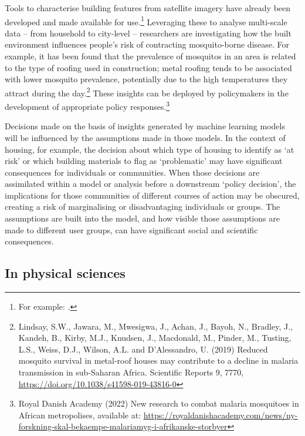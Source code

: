 Tools to characterise building features from satellite imagery have
already been developed and made available for use.\footnote{For example: \cite{Quinn-mapping21}.} Leveraging these to analyse multi-scale data -- from household to
city-level -- researchers are investigating how the built environment
influences people's risk of contracting mosquito-borne disease. For
example, it has been found that the prevalence of mosquitos in an area
is related to the type of roofing used in construction; metal roofing
tends to be associated with lower mosquito prevalence, potentially due
to the high temperatures they attract during the day.\footnote{Lindsay,
  S.W., Jawara, M., Mwesigwa, J., Achan, J., Bayoh, N., Bradley, J.,
  Kandeh, B., Kirby, M.J., Knudsen, J., Macdonald, M., Pinder, M.,
  Tusting, L.S., Weiss, D.J., Wilson, A.L. and D'Alessandro, U. (2019)
  Reduced mosquito survival in metal-roof houses may contribute to a
  decline in malaria transmission in sub-Saharan Africa. Scientific
  Reports 9, 7770,
  \href{https://doi.org/10.1038/s41598-019-43816-0}{\uline{https://doi.org/10.1038/s41598-019-43816-0}}}
These insights can be deployed by policymakers in the development of
appropriate policy responses.\footnote{Royal Danish Academy (2022) New
  research to combat malaria mosquitoes in African metropolises,
  available at:
  \href{https://royaldanishacademy.com/news/ny-forskning-skal-bekaempe-malariamyg-i-afrikanske-storbyer}{\uline{https://royaldanishacademy.com/news/ny-forskning-skal-bekaempe-malariamyg-i-afrikanske-storbyer}}}

Decisions made on the basis of insights generated by machine learning
models will be influenced by the assumptions made in those models. In
the context of housing, for example, the decision about which type of
housing to identify as `at risk' or which building materials to flag as
`problematic' may have significant consequences for individuals or
communities. When those decisions are assimilated within a model or
analysis before a downstream `policy decision', the implications for
those communities of different courses of action may be obscured,
creating a risk of marginalising or disadvantaging individuals or
groups. The assumptions are built into the model, and how visible those
assumptions are made to different user groups, can have significant
social and scientific consequences.

\subsection{In physical sciences}\label{in-physical-sciences}

